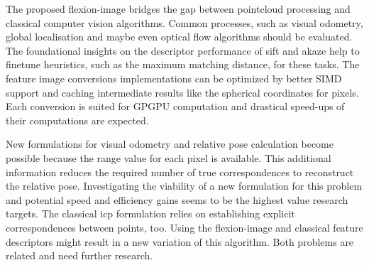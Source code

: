 The proposed \gls{flexion-image} bridges the gap between pointcloud processing and classical computer vision algorithms.
Common processes, such as visual odometry, global localisation and maybe even optical flow algorithms should be evaluated.
The foundational insights on the descriptor performance of \acrshort{sift} and \acrshort{akaze} help to finetune heuristics, such as the maximum matching distance, for these tasks.
The feature image conversions implementations can be optimized by better \acrshort{SIMD} support and caching intermediate results like the spherical coordinates for pixels.
Each conversion is suited for \acrshort{GPGPU} computation and drastical speed-ups of their computations are expected.

New formulations for visual odometry and relative pose calculation become possible because the range value for each pixel is available.
This additional information reduces the required number of true correspondences to reconstruct the relative pose.
Investigating the viability of a new formulation for this problem and potential speed and efficiency gains seems to be the highest value research targets.
The classical \acrshort{icp} formulation relies on establishing explicit correspondences between points, too.
Using the \gls{flexion-image} and classical feature descriptors might result in a new variation of this algorithm.
Both problems are related and need further research.
